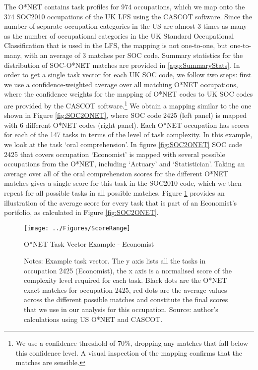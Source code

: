 \documentclass[12pt,authoryear]{elsarticle}
\begin{document}
	The O*NET contains task profiles for 974 occupations, which we map onto the 374 SOC2010 occupations of the UK LFS using the CASCOT software. Since the number of separate occupation categories in the US are almost 3 times as many as the number of occupational categories in the UK Standard Occupational Classification that is used in the LFS, the mapping is not one-to-one, but one-to-many, with an average of 3 matches per SOC code. Summary statistics for the distribution of SOC-O*NET matches are provided in \ref{app:SummaryStats}. In order to get a single task vector for each UK SOC code, we follow two steps: first we use a confidence-weighted average over all matching O*NET occupations, where the confidence weights for the mapping of O*NET codes to UK SOC codes are provided by the CASCOT software.\footnote{We use a confidence threshold of 70\%, dropping any matches that fall below this confidence level. A visual inspection of the mapping confirms that the matches are sensible.} We obtain a mapping similar to the one shown in Figure \ref{fig:SOC2ONET}, where SOC code 2425 (left panel) is mapped with 6 different O*NET codes (right panel). Each O*NET occupation has scores for each of the 147 tasks in terms of the level of task complexity. In this example, we look at the task `oral comprehension'. In figure \ref{fig:SOC2ONET} SOC code 2425 that covers occupation `Economist' is mapped with several possible occupations from the O*NET, including `Actuary' and `Statistician'. Taking an average over all of the oral comprehension scores for the different O*NET matches gives a single score for this task in the SOC2010 code, which we then repeat for all possible tasks in all possible matches. Figure \ref{fig:ONETScoreRange} provides an illustration of the average score for every task that is part of an Economist's portfolio, as calculated in Figure \ref{fig:SOC2ONET}.
	
	\begin{landscape}
		\begin{figure}[h!]
			\centering
			\texttt{[image: ../Figures/ScoreRange]}
			\caption{O*NET Task Vector Example - Economist}
			\caption*{\footnotesize{Notes: Example task vector. The y axis lists all the tasks in occupation 2425 (Economist), the x axis is a normalised score of the complexity level required for each task. Black dots are the O*NET exact matches for occupation 2425, red dots are the average values across the different possible matches and constitute the final scores that we use in our analysis for this occupation. Source: author's calculations using US O*NET and CASCOT.}}
			\label{fig:ONETScoreRange}
		\end{figure}
	\end{landscape}
	
\end{document}
